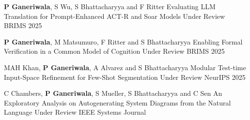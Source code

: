 


\begin{cventries}
\cventry
{\textbf{P Ganeriwala}, S Wu, S Bhattacharyya and F Ritter}
{
Evaluating LLM Translation for Prompt-Enhanced ACT-R and Soar Models}
{Under Review}
{BRIMS 2025} 
{ %
\begin{cvitems}
\end{cvitems}
}
\cventry
{\textbf{P Ganeriwala}, M Matsumuro, F Ritter and S Bhattacharyya}
{
Enabling Formal Verification in a Common Model of Cognition}
{Under Review}
{BRIMS 2025} 
{ %
\begin{cvitems}
\end{cvitems}
}
\cventry
{MAH Khan, \textbf{P Ganeriwala}, A Alvarez and S Bhattacharyya}
{
Modular Test-time Input-Space Refinement for Few-Shot Segmentation}
{Under Review}
{NeurIPS 2025} 
{ %
\begin{cvitems}
\end{cvitems}
}
\cventry
{C Chambers, \textbf{P Ganeriwala}, S Mueller, S Bhattacharyya and C Sen}
{An Exploratory Analysis on Autogenerating System Diagrams from the Natural Language}
{Under Review}
{IEEE Systems Journal} 
{ %
\begin{cvitems}
\end{cvitems}
}
\end{cventries}
